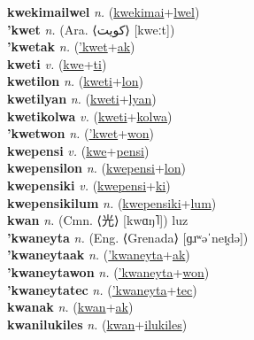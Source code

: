 \textbf{kwekimailwel} \textit{n.} (\hyperref[kwekimai]{kwekimai}+\hyperref[lwel]{lwel})
 \label{kwekimailwel} \\
\textbf{'kwet} \textit{n.} (Ara. ⟨كويت⟩ [kweːt])
 \label{'kwet} \\
\textbf{'kwetak} \textit{n.} (\hyperref['kwet]{'kwet}+\hyperref[ak]{ak})
 \label{'kwetak} \\
\textbf{kweti} \textit{v.} (\hyperref[kwe]{kwe}+\hyperref[ti]{ti})
 \label{kweti} \\
\textbf{kwetilon} \textit{n.} (\hyperref[kweti]{kweti}+\hyperref[lon]{lon})
 \label{kwetilon} \\
\textbf{kwetilyan} \textit{n.} (\hyperref[kweti]{kweti}+\hyperref[lyan]{lyan})
 \label{kwetilyan} \\
\textbf{kwetikolwa} \textit{v.} (\hyperref[kweti]{kweti}+\hyperref[kolwa]{kolwa})
 \label{kwetikolwa} \\
\textbf{'kwetwon} \textit{n.} (\hyperref['kwet]{'kwet}+\hyperref[won]{won})
 \label{'kwetwon} \\
\textbf{kwepensi} \textit{v.} (\hyperref[kwe]{kwe}+\hyperref[pensi]{pensi})
 \label{kwepensi} \\
\textbf{kwepensilon} \textit{n.} (\hyperref[kwepensi]{kwepensi}+\hyperref[lon]{lon})
 \label{kwepensilon} \\
\textbf{kwepensiki} \textit{v.} (\hyperref[kwepensi]{kwepensi}+\hyperref[ki]{ki})
 \label{kwepensiki} \\
\textbf{kwepensikilum} \textit{n.} (\hyperref[kwepensiki]{kwepensiki}+\hyperref[lum]{lum})
 \label{kwepensikilum} \\
\textbf{kwan} \textit{n.} (Cmn. ⟨光⟩ [kwɑŋ˥])
luz \label{kwan} \\
\textbf{'kwaneyta} \textit{n.} (Eng. ⟨Grenada⟩ [ɡɹʷəˈneɪ̯də])
 \label{'kwaneyta} \\
\textbf{'kwaneytaak} \textit{n.} (\hyperref['kwaneyta]{'kwaneyta}+\hyperref[ak]{ak})
 \label{'kwaneytaak} \\
\textbf{'kwaneytawon} \textit{n.} (\hyperref['kwaneyta]{'kwaneyta}+\hyperref[won]{won})
 \label{'kwaneytawon} \\
\textbf{'kwaneytatec} \textit{n.} (\hyperref['kwaneyta]{'kwaneyta}+\hyperref[tec]{tec})
 \label{'kwaneytatec} \\
\textbf{kwanak} \textit{n.} (\hyperref[kwan]{kwan}+\hyperref[ak]{ak})
 \label{kwanak} \\
\textbf{kwanilukiles} \textit{n.} (\hyperref[kwan]{kwan}+\hyperref[ilukiles]{ilukiles})
 \label{kwanilukiles} \\
